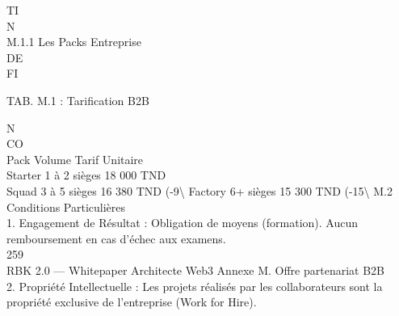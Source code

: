 \vspace{0.5em}
\vspace{0.5em}
\vspace{0.5em}
TI\\
N\\
M.1.1 Les Packs Entreprise\\
\vspace{0.5em}
\vspace{0.5em}
\vspace{0.5em}
\vspace{0.5em}
DE\\
FI\\
\begin{center}\begin{tabular}TAB. M.1 : Tarification B2B\end{tabular}\end{center}
\vspace{0.5em}
\vspace{0.5em}
\vspace{0.5em}
N\\
CO\\
Pack      Volume         Tarif Unitaire\\
Starter 1 à 2 sièges 18 000 TND\\
Squad     3 à 5 sièges 16 380 TND (-9\textbackslash{}%
Factory 6+ sièges        15 300 TND (-15\textbackslash{}%
\vspace{0.5em}
\vspace{0.5em}
\vspace{0.5em}
\vspace{0.5em}
M.2 Conditions Particulières\\
1. Engagement de Résultat : Obligation de moyens (formation). Aucun remboursement en cas d’échec aux examens.\\
\vspace{0.5em}
\vspace{0.5em}
\vspace{0.5em}
259\\
RBK 2.0 — Whitepaper Architecte Web3                                                                                              Annexe M. Offre partenariat B2B\\
\vspace{0.5em}
\vspace{0.5em}
2. Propriété Intellectuelle : Les projets réalisés par les collaborateurs sont la propriété exclusive de l’entreprise (Work for Hire).\\
